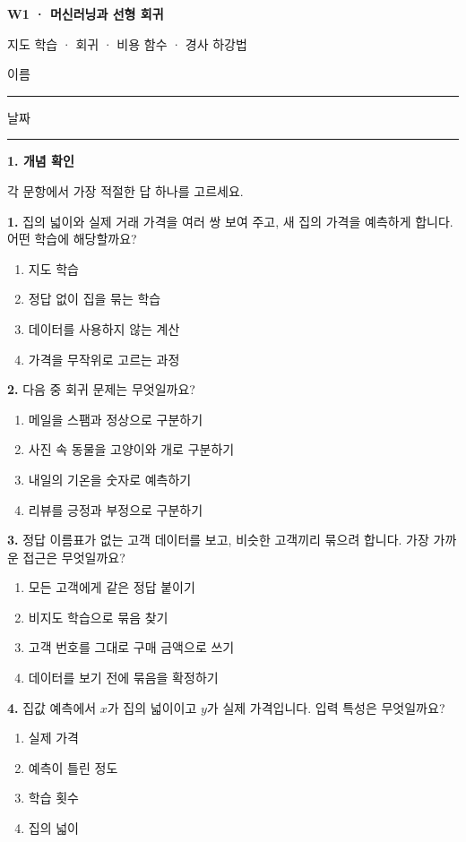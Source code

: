 \documentclass[11pt,a4paper]{article}
\newcommand{\parttitle}[2]{{\large\bfseries\color{ink} #1}\par{\small #2}\par\vspace{5mm}}
\newcommand{\question}[2]{\textbf{#1.} #2\par}
\begin{document}
{\LARGE\bfseries\color{ink} W1 · 머신러닝과 선형 회귀}\par
{\small 지도 학습 · 회귀 · 비용 함수 · 경사 하강법}\par
\vspace{3mm}이름\enspace\rule{43mm}{0.3pt}\hfill 날짜\enspace\rule{35mm}{0.3pt}\par\vspace{3mm}
\parttitle{1. 개념 확인}{각 문항에서 가장 적절한 답 하나를 고르세요.}
\question{1}{집의 넓이와 실제 거래 가격을 여러 쌍 보여 주고, 새 집의 가격을 예측하게 합니다. 어떤 학습에 해당할까요?}
\begin{enumerate}[label=(\arabic*),leftmargin=9mm,itemsep=0pt,topsep=2pt,parsep=0pt]
\item 지도 학습
\item 정답 없이 집을 묶는 학습
\item 데이터를 사용하지 않는 계산
\item 가격을 무작위로 고르는 과정
\end{enumerate}\vfill
\question{2}{다음 중 회귀 문제는 무엇일까요?}
\begin{enumerate}[label=(\arabic*),leftmargin=9mm,itemsep=0pt,topsep=2pt,parsep=0pt]
\item 메일을 스팸과 정상으로 구분하기
\item 사진 속 동물을 고양이와 개로 구분하기
\item 내일의 기온을 숫자로 예측하기
\item 리뷰를 긍정과 부정으로 구분하기
\end{enumerate}\vfill
\question{3}{정답 이름표가 없는 고객 데이터를 보고, 비슷한 고객끼리 묶으려 합니다. 가장 가까운 접근은 무엇일까요?}
\begin{enumerate}[label=(\arabic*),leftmargin=9mm,itemsep=0pt,topsep=2pt,parsep=0pt]
\item 모든 고객에게 같은 정답 붙이기
\item 비지도 학습으로 묶음 찾기
\item 고객 번호를 그대로 구매 금액으로 쓰기
\item 데이터를 보기 전에 묶음을 확정하기
\end{enumerate}\vfill
\question{4}{집값 예측에서 $x$가 집의 넓이이고 $y$가 실제 가격입니다. 입력 특성은 무엇일까요?}
\begin{enumerate}[label=(\arabic*),leftmargin=9mm,itemsep=0pt,topsep=2pt,parsep=0pt]
\item 실제 가격
\item 예측이 틀린 정도
\item 학습 횟수
\item 집의 넓이
\end{enumerate}\vfill
\end{document}
